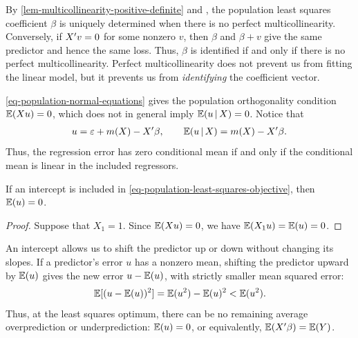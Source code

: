 \documentclass[a4paper,12pt]{article}
\begin{document}
\begin{remark}
	By \autoref{lem-multicollinearity-positive-definite} and ,
	the population least squares coefficient $\beta$ is uniquely determined when there is no perfect multicollinearity.
	Conversely, if $X^{\prime} v=0$ for some nonzero $v$,
	then $\beta$ and $\beta+v$ give the same predictor and hence the same loss.
	Thus, $\beta$ is identified if and only if there is no perfect multicollinearity.
	Perfect multicollinearity does not prevent us from fitting the linear model,
	but it prevents us from \emph{identifying} the coefficient vector.
\end{remark}

\begin{remark}
	\autoref{eq-population-normal-equations} gives the population orthogonality condition $\operatorname{\mathbb{E}}(X u)=0$,
	which does not in general imply $\operatorname{\mathbb{E}}(u\mathpunct{}|\mathpunct{} X)=0$.
	Notice that
	\begin{align}
		u=\varepsilon+m(X)-X^{\prime}\beta,
		\qquad \operatorname{\mathbb{E}}(u\mathpunct{}|\mathpunct{} X)=m(X)-X^{\prime}\beta.
	\end{align}
	Thus, the regression error has zero conditional mean if and only if the conditional mean is linear in the included regressors.
\end{remark}

\begin{proposition}\label{prop-intercept-orthogonality}
	If an intercept is included in \eqref{eq-population-least-squares-objective}, then $\operatorname{\mathbb{E}}(u)=0$.
\end{proposition}
\begin{proof}
	Suppose that $X_1=1$.
	Since $\operatorname{\mathbb{E}}(X u)=0$, we have $\operatorname{\mathbb{E}}(X_1 u)=\operatorname{\mathbb{E}}(u)=0$.
\end{proof}

\begin{remark}
	An intercept allows us to shift the predictor up or down without changing its slopes.
	If a predictor's error $u$ has a nonzero mean, shifting the predictor upward by $\operatorname{\mathbb{E}}(u)$ gives the new error $u-\operatorname{\mathbb{E}}(u)$,
	with strictly smaller mean squared error:
	\begin{align*}
		\operatorname{\mathbb{E}}[(u-\operatorname{\mathbb{E}}(u))^2]=\operatorname{\mathbb{E}}(u^2)-\operatorname{\mathbb{E}}(u)^2<\operatorname{\mathbb{E}}(u^2).
	\end{align*}
	Thus, at the least squares optimum, there can be no remaining average overprediction or underprediction:
	$\operatorname{\mathbb{E}}(u)=0$, or equivalently, $\operatorname{\mathbb{E}}(X^{\prime}\beta)=\operatorname{\mathbb{E}}(Y)$.
\end{remark}
\end{document}
